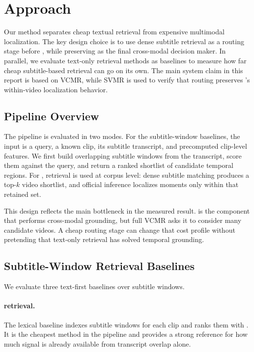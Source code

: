 \section{Approach}
\label{sec:approach}

Our method separates cheap textual retrieval from expensive multimodal localization. The key design choice is to use dense subtitle retrieval as a routing stage before \xml, while preserving \xml as the final cross-modal decision maker. In parallel, we evaluate text-only retrieval methods as baselines to measure how far cheap subtitle-based retrieval can go on its own. The main system claim in this report is based on VCMR, while SVMR is used to verify that routing preserves \xml's within-video localization behavior.

\subsection{Pipeline Overview}
The pipeline is evaluated in two modes. For the subtitle-window baselines, the input is a query, a known clip, its subtitle transcript, and precomputed clip-level features. We first build overlapping subtitle windows from the transcript, score them against the query, and return a ranked shortlist of candidate temporal regions. For \xml, retrieval is used at corpus level: dense subtitle matching produces a top-$k$ video shortlist, and official \xml inference localizes moments only within that retained set.

This design reflects the main bottleneck in the measured result. \xml is the component that performs cross-modal grounding, but full VCMR asks it to consider many candidate videos. A cheap routing stage can change that cost profile without pretending that text-only retrieval has solved temporal grounding.

\subsection{Subtitle-Window Retrieval Baselines}
We evaluate three text-first baselines over subtitle windows.

\paragraph{\bm retrieval.}
The lexical baseline indexes subtitle windows for each clip and ranks them with \bm. It is the cheapest method in the pipeline and provides a strong reference for how much signal is already available from transcript overlap alone.

